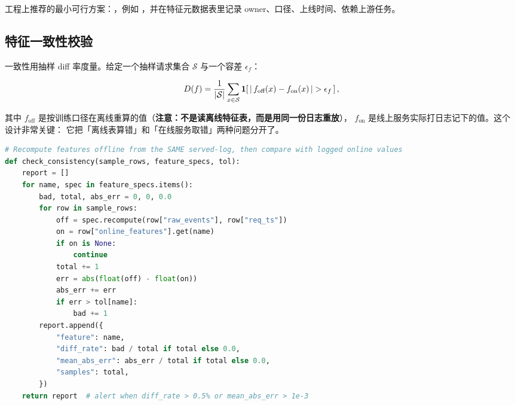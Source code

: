 工程上推荐的最小可行方案：，例如
，并在特征元数据表里记录 owner、口径、上线时间、依赖上游任务。

\subsection{特征一致性校验}

一致性用抽样 diff 率度量。给定一个抽样请求集合 $\mathcal{S}$ 与一个容差 $\epsilon_f$：

\begin{equation}
D(f) = \frac{1}{\left\lvert \mathcal{S} \right\rvert} \sum_{x \in \mathcal{S}}
\mathbf{1}\!\left[\, \left\lvert \,f_{\text{off}}(x) - f_{\text{on}}(x)\, \right\rvert > \epsilon_f \,\right],
\label{eq:feat-diff}
\end{equation}

其中 $f_{\text{off}}$ 是按训练口径在离线重算的值（\textbf{注意：不是读离线特征表，而是用同一份日志重放}），
$f_{\text{on}}$ 是线上服务实际打日志记下的值。这个设计非常关键：
它把「离线表算错」和「在线服务取错」两种问题分开了。

\begin{lstlisting}[style=growth, language=Python, caption={特征一致性 diff 校验框架（伪代码）}]
# Recompute features offline from the SAME served-log, then compare with logged online values
def check_consistency(sample_rows, feature_specs, tol):
    report = []
    for name, spec in feature_specs.items():
        bad, total, abs_err = 0, 0, 0.0
        for row in sample_rows:
            off = spec.recompute(row["raw_events"], row["req_ts"])
            on = row["online_features"].get(name)
            if on is None:
                continue
            total += 1
            err = abs(float(off) - float(on))
            abs_err += err
            if err > tol[name]:
                bad += 1
        report.append({
            "feature": name,
            "diff_rate": bad / total if total else 0.0,
            "mean_abs_err": abs_err / total if total else 0.0,
            "samples": total,
        })
    return report  # alert when diff_rate > 0.5% or mean_abs_err > 1e-3
\end{lstlisting}

